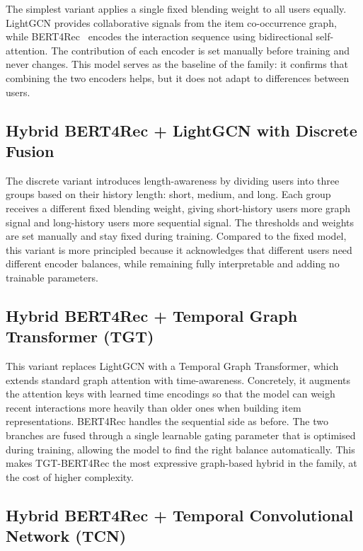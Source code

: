 \documentclass[12pt,a4paper]{report}
\begin{document}
The simplest variant applies a single fixed blending weight to all users
equally. LightGCN provides collaborative signals from the item co-occurrence
graph, while BERT4Rec~\citep{sun2019bert4rec} encodes the interaction sequence
using bidirectional self-attention. The contribution of each encoder is set
manually before training and never changes. This model serves as the baseline
of the family: it confirms that combining the two encoders helps, but it does
not adapt to differences between users.

\subsection{Hybrid BERT4Rec + LightGCN with Discrete Fusion}
\label{sec:discrete}

The discrete variant introduces length-awareness by dividing users into three
groups based on their history length: short, medium, and long. Each group
receives a different fixed blending weight, giving short-history users more
graph signal and long-history users more sequential signal. The thresholds and
weights are set manually and stay fixed during training. Compared to the fixed
model, this variant is more principled because it acknowledges that different
users need different encoder balances, while remaining fully interpretable and
adding no trainable parameters.

\subsection{Hybrid BERT4Rec + Temporal Graph Transformer (TGT)}
\label{sec:tgt}

This variant replaces LightGCN with a Temporal Graph Transformer, which
extends standard graph attention with time-awareness. Concretely, it augments
the attention keys with learned time encodings so that the model can weigh
recent interactions more heavily than older ones when building item
representations. BERT4Rec handles the sequential side as before. The two
branches are fused through a single learnable gating parameter that is
optimised during training, allowing the model to find the right balance
automatically. This makes TGT-BERT4Rec the most expressive graph-based hybrid
in the family, at the cost of higher complexity.

\subsection{Hybrid BERT4Rec + Temporal Convolutional Network (TCN)}
\label{sec:tcn}
\end{document}
